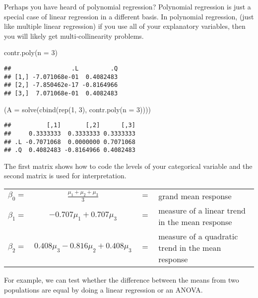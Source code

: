 \documentclass[
]{book}
\newenvironment{Shaded}{\begin{snugshade}}{\end{snugshade}}
\newcommand{\AttributeTok}[1]{\textcolor[rgb]{0.77,0.63,0.00}{#1}}
\newcommand{\DecValTok}[1]{\textcolor[rgb]{0.00,0.00,0.81}{#1}}
\newcommand{\FunctionTok}[1]{\textcolor[rgb]{0.00,0.00,0.00}{#1}}
\newcommand{\NormalTok}[1]{#1}
\begin{document}
Perhaps you have heard of polynomial regression? Polynomial regression
is just a special case of linear regression in a different basis. In
polynomial regression, (just like multiple linear regression) if you use
all of your explanatory variables, then you will likely get
multi-collinearity problems.

\begin{Shaded}
\begin{Highlighting}[]
\FunctionTok{contr.poly}\NormalTok{(}\AttributeTok{n =} \DecValTok{3}\NormalTok{)}
\end{Highlighting}
\end{Shaded}

\begin{verbatim}
##                 .L         .Q
## [1,] -7.071068e-01  0.4082483
## [2,] -7.850462e-17 -0.8164966
## [3,]  7.071068e-01  0.4082483
\end{verbatim}

\begin{Shaded}
\begin{Highlighting}[]
\NormalTok{(}\AttributeTok{A =} \FunctionTok{solve}\NormalTok{(}\FunctionTok{cbind}\NormalTok{(}\FunctionTok{rep}\NormalTok{(}\DecValTok{1}\NormalTok{, }\DecValTok{3}\NormalTok{), }\FunctionTok{contr.poly}\NormalTok{(}\AttributeTok{n =} \DecValTok{3}\NormalTok{))))}
\end{Highlighting}
\end{Shaded}

\begin{verbatim}
##          [,1]       [,2]      [,3]
##     0.3333333  0.3333333 0.3333333
## .L -0.7071068  0.0000000 0.7071068
## .Q  0.4082483 -0.8164966 0.4082483
\end{verbatim}

The first matrix shows how to code the levels of your categorical
variable and the second matrix is used for interpretation.

\begin{tabularx}{\textwidth}{r c c X}
\(\beta_0 =\) &\(\tfrac{\mu_1+\mu_2+\mu_3}{3}\) &\(=\) &grand mean response \\
\(\beta_1 =\) &\(-0.707\mu_1 + 0.707\mu_3\) &\(=\) &measure of a linear trend in the mean response \\
\(\beta_2 =\) &\(0.408 \mu_3 - 0.816 \mu_2 + 0.408 \mu_3\) &\(=\) &measure of a quadratic trend in the mean response
\end{tabularx}

For example, we can test whether the difference between the means from
two populations are equal by doing a linear regression or an ANOVA.
\end{document}
